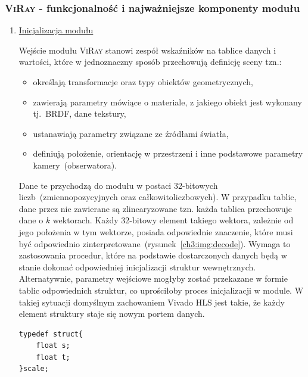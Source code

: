 \subsubsection{\textsc{ViRay} - funkcjonalność i najważniejsze komponenty modułu}
\begin{enumerate}


\item \underline{Inicjalizacja modułu}

Wejście modułu \textsc{ViRay} stanowi zespół wskaźników na tablice danych i wartości, które w jednoznaczny sposób przechowują definicję sceny tzn.:
\begin{itemize}
\item określają transformacje oraz typy obiektów geometrycznych,
\item zawierają parametry mówiące o materiale, z jakiego obiekt jest wykonany tj.~BRDF, dane tekstury,
\item ustanawiają parametry związane ze źródłami światła,
\item definiują położenie, orientację w przestrzeni i inne podstawowe parametry kamery~(obserwatora).
\end{itemize}
Dane te przychodzą do modułu w postaci 32-bitowych liczb~(zmiennopozycyjnych oraz całkowitoliczbowych). W przypadku tablic, dane przez nie zawierane są zlinearyzowane tzn. każda tablica przechowuje dane o $k$ wektorach. Każdy 32-bitowy element takiego wektora, zależnie od jego położenia w tym wektorze, posiada odpowiednie znaczenie, które musi być odpowiednio zinterpretowane~(rysunek~\ref{ch3:img:decode}). Wymaga to zastosowania procedur, które na podstawie dostarczonych danych będą w stanie dokonać odpowiedniej inicjalizacji struktur wewnętrznych.
Alternatywnie, parametry wejściowe mogłyby zostać przekazane w formie tablic odpowiednich struktur, co uprościłoby proces inicjalizacji w module. W takiej sytuacji domyślnym zachowaniem Vivado HLS jest takie, że każdy element struktury staje się nowym portem danych.
\begin{lstlisting}
typedef struct{
	float s;
	float t;
}scale;
\end{lstlisting}

\end{enumerate}
